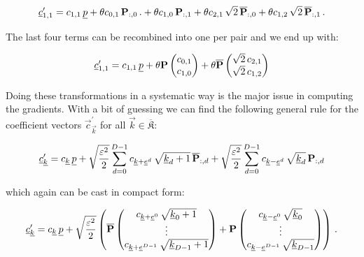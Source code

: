 \begin{equation*}
  \underline{c}^\prime_{1,1} = c_{1,1} \, \underline{p}
+ \theta c_{0,1} \, \mathbf{P}_{:,0} \,.
+ \theta c_{1,0} \, \mathbf{P}_{:,1}
+ \theta c_{2,1} \, \sqrt{2} \, \overline{\mathbf{P}}_{:,0}
+ \theta c_{1,2} \, \sqrt{2} \, \overline{\mathbf{P}}_{:,1} \,.
\end{equation*}

The last four terms can be recombined into one per pair and we end up with:

\begin{equation*}
  \underline{c}^\prime_{1,1} = c_{1,1} \, \underline{p}
+ \theta \mathbf{P}
  \begin{pmatrix}
    c_{0,1} \\ c_{1,0}
  \end{pmatrix}
+ \theta \overline{\mathbf{P}}
  \begin{pmatrix}
    \sqrt{2} \, c_{2,1} \\ \sqrt{2} \, c_{1,2}
  \end{pmatrix}
\end{equation*}

Doing these transformations in a systematic way is the major issue in computing the gradients.
With a bit of guessing we can find the following general rule for the coefficient vectors
$\vec{c}^\prime_{\vec{k}}$ for all $\vec{k} \in \overline{\mathfrak{K}}$:

\begin{equation*}
  \underline{c}^\prime_{\underline{k}} = c_{\underline{k}} \, \underline{p}
                             + \sqrt{\frac{\varepsilon^2}{2}} \sum_{d=0}^{D-1} c_{\underline{k}+\underline{e}^d} \, \sqrt{\underline{k}_{d}+1} \, \overline{\mathbf{P}}_{:,d}
                             + \sqrt{\frac{\varepsilon^2}{2}} \sum_{d=0}^{D-1} c_{\underline{k}-\underline{e}^d} \, \sqrt{\underline{k}_{d}} \, \mathbf{P}_{:,d}
\end{equation*}

which again can be cast in compact form:

\begin{equation} \label{eq:gradient_coefficients_DD}
  \underline{c}^\prime_{\underline{k}} = c_{\underline{k}} \, \underline{p}
                             + \sqrt{\frac{\varepsilon^2}{2}} \left(
                               \overline{\mathbf{P}}
                               \begin{pmatrix}
                                 c_{\underline{k}+\underline{e}^0} \, \sqrt{\underline{k}_{0}+1} \\
                                 \vdots \\
                                 c_{\underline{k}+\underline{e}^{D-1}} \, \sqrt{\underline{k}_{D-1}+1}
                               \end{pmatrix}
                             + \mathbf{P}
                               \begin{pmatrix}
                                 c_{\underline{k}-\underline{e}^0} \, \sqrt{\underline{k}_{0}} \\
                                 \vdots \\
                                 c_{\underline{k}-\underline{e}^{D-1}} \, \sqrt{\underline{k}_{D-1}}
                               \end{pmatrix}
                               \right) \,.
\end{equation}


